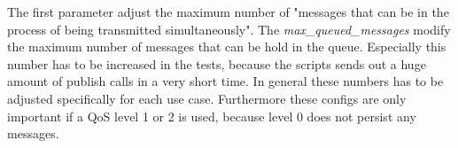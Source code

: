 The first parameter adjust the maximum number of "messages that can be in the process of being transmitted simultaneously"\autocite{Mosquitto:Conf:Documentation}.
The \textit{max\_queued\_messages} modify the maximum number of messages that can be hold in the queue.\autocite[cf.]{Mosquitto:Conf:Documentation}
Especially this number has to be increased in the tests, because the scripts sends out a huge amount of publish calls in a very short time.
In general these numbers has to be adjusted specifically for each use case.
Furthermore these configs are only important if a \ac{QoS} level 1 or 2 is used, because level 0 does not persist any messages.
